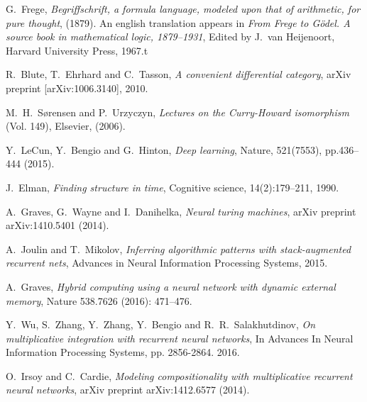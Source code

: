 \documentclass[english,letter paper,12pt,leqno]{article}
\theoremstyle{example}
\numberwithin{equation}{section}
\begin{document}


\providecommand{\bysame}{\leavevmode\hbox to3em{\hrulefill}\thinspace}
\providecommand{\href}[2]{#2}
\begin{thebibliography}{BHLS03}

G.~Frege, \textsl{Begriffschrift, a formula language, modeled upon that of arithmetic, for pure thought}, (1879). An english translation appears in \textsl{From Frege to G\"odel. A source book in mathematical logic, 1879--1931}, Edited by J.~van Heijenoort, Harvard University Press, 1967.t

R.~Blute, T.~Ehrhard and C.~Tasson, \textsl{A convenient differential category}, arXiv preprint \href{https://arxiv.org/abs/1006.3140}{[arXiv:1006.3140]}, 2010.

M.~H.~S\o rensen and P.~Urzyczyn, \textsl{Lectures on the Curry-Howard isomorphism} (Vol. 149), Elsevier, (2006).

Y.~LeCun, Y.~Bengio and G.~Hinton, \textsl{Deep learning},  Nature, 521(7553), pp.436--444 (2015).

J.~Elman, \textsl{Finding structure in time}, Cognitive science, 14(2):179–211, 1990.

A.~Graves, G.~Wayne and I.~Danihelka, \textsl{Neural turing machines}, arXiv preprint arXiv:1410.5401 (2014).

A.~Joulin and T.~Mikolov, \textsl{Inferring algorithmic patterns with stack-augmented recurrent nets}, Advances in Neural Information Processing Systems, 2015.

A.~Graves, \textsl{Hybrid computing using a neural network with dynamic external memory}, Nature 538.7626 (2016): 471--476.

Y.~Wu, S.~Zhang, Y.~Zhang, Y.~Bengio and R.~R.~Salakhutdinov, \textsl{On multiplicative integration with recurrent neural networks}, In Advances In Neural Information Processing Systems, pp. 2856-2864. 2016.

O.~Irsoy and C.~Cardie, \textsl{Modeling compositionality with multiplicative recurrent neural networks}, arXiv preprint arXiv:1412.6577 (2014).


\end{thebibliography}
\end{document}
